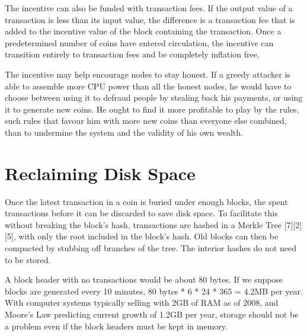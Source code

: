 \documentclass{article}
\begin{document}
The incentive can also be funded with transaction fees.
If the output value of a transaction is
less than its input value, the difference is a transaction fee that is added to the incentive value of
the block containing the transaction.
Once a predetermined number of coins have entered
circulation, the incentive can transition entirely to transaction fees and be completely inflation
free.

The incentive may help encourage nodes to stay honest.
If a greedy attacker is able to
assemble more CPU power than all the honest nodes, he would have to choose between using it
to defraud people by stealing back his payments, or using it to generate new coins.
He ought to find it more profitable to play by the rules, such rules that favour him with more new coins than
everyone else combined, than to undermine the system and the validity of his own wealth.

\section{Reclaiming Disk Space}\label{sec:reclaiming-disk-space}
Once the latest transaction in a coin is buried under enough blocks, the spent transactions before
it can be discarded to save disk space.
To facilitate this without breaking the block's hash,
transactions are hashed in a Merkle Tree [7][2][5], with only the root included in the block's hash.
Old blocks can then be compacted by stubbing off branches of the tree.
The interior hashes do not need to be stored.



A block header with no transactions would be about 80 bytes.
If we suppose blocks are generated every 10 minutes, 80 bytes * 6 * 24 * 365 = 4.2MB per year.
With computer systems typically selling with 2GB of RAM as of 2008, and Moore's Law predicting current growth of
1.2GB per year, storage should not be a problem even if the block headers must be kept in memory.
\end{document}
